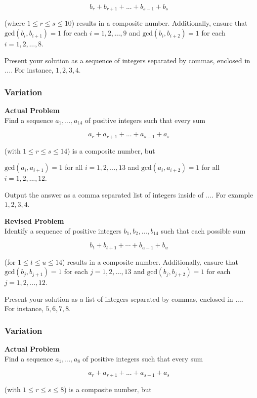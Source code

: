 $$b_r + b_{r+1} + ... + b_{s-1} + b_s$$

(where $1 \leq r \leq s \leq 10$) results in a composite number. Additionally, ensure that $\text{gcd}(b_i, b_{i+1}) = 1$ for each $i = 1, 2, \ldots, 9$ and $\text{gcd}(b_i, b_{i+2}) = 1$ for each $i = 1, 2, \ldots, 8$.

Present your solution as a sequence of integers separated by commas, enclosed in $\boxed{...}$. For instance, $\boxed{1,2,3,4}$.

\subsubsection{Variation}
\textbf{Actual Problem}\\
Find a sequence $a_1, ..., a_{14}$ of positive integers such that every sum

$$a_r + a_{r+1} + ... + a_{s-1} + a_s$$

(with $1 \leqslant r \leqslant s \leqslant 14$) is a composite number, but

$\text{gcd}(a_i, a_{i+1}) = 1$ for all $i = 1,2,...,13$ and $\text{gcd}(a_i, a_{i+2}) = 1$ for all $i = 1,2,...,12$.

Output the answer as a comma separated list of integers inside of $\boxed{...}$. For example $\boxed{1,2,3,4}$.

\textbf{Revised Problem}\\
Identify a sequence of positive integers $b_1, b_2, \ldots, b_{14}$ such that each possible sum

$$b_t + b_{t+1} + \cdots + b_{u-1} + b_u$$

(for $1 \le t \le u \le 14$) results in a composite number. Additionally, ensure that $\text{gcd}(b_j, b_{j+1}) = 1$ for each $j = 1, 2, \ldots, 13$ and $\text{gcd}(b_j, b_{j+2}) = 1$ for each $j = 1, 2, \ldots, 12$.

Present your solution as a list of integers separated by commas, enclosed in $\boxed{...}$. For instance, $\boxed{5,6,7,8}$.

\subsubsection{Variation}
\textbf{Actual Problem}\\
Find a sequence $a_1, ..., a_{8}$ of positive integers such that every sum

$$a_r + a_{r+1} + ... + a_{s-1} + a_s$$

(with $1 \leqslant r \leqslant s \leqslant 8$) is a composite number, but

